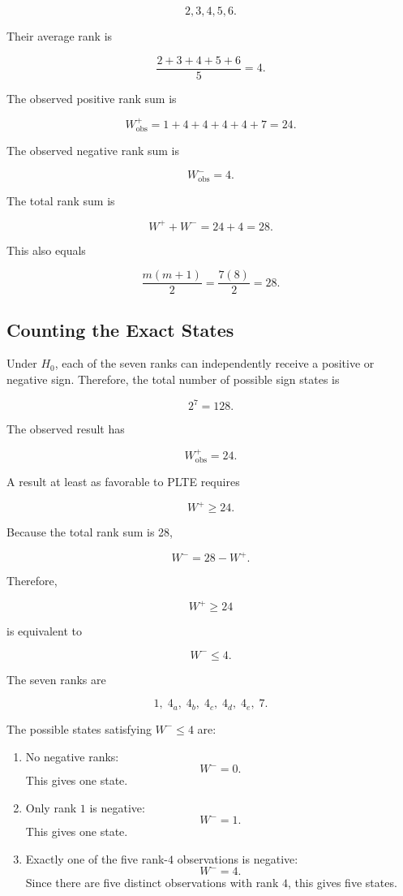 \documentclass[11pt]{article}
\begin{document}
\[
2,3,4,5,6.
\]

Their average rank is

\[
\frac{2+3+4+5+6}{5}=4.
\]

The observed positive rank sum is

\[
W^+_{\mathrm{obs}}
=
1+4+4+4+4+7
=
24.
\]

The observed negative rank sum is

\[
W^-_{\mathrm{obs}}=4.
\]

The total rank sum is

\[
W^++W^-=24+4=28.
\]

This also equals

\[
\frac{m(m+1)}{2}
=
\frac{7(8)}{2}
=
28.
\]

\subsection{Counting the Exact States}

Under \(H_0\), each of the seven ranks can independently receive a
positive or negative sign. Therefore, the total number of possible sign
states is

\[
2^7=128.
\]

The observed result has

\[
W^+_{\mathrm{obs}}=24.
\]

A result at least as favorable to PLTE requires

\[
W^+\geq24.
\]

Because the total rank sum is 28,

\[
W^-=28-W^+.
\]

Therefore,

\[
W^+\geq24
\]

is equivalent to

\[
W^-\leq4.
\]

The seven ranks are

\[
1,\;4_a,\;4_b,\;4_c,\;4_d,\;4_e,\;7.
\]

The possible states satisfying \(W^-\leq4\) are:

\begin{enumerate}[noitemsep]
    \item No negative ranks:
    \[
    W^-=0.
    \]
    This gives one state.

    \item Only rank \(1\) is negative:
    \[
    W^-=1.
    \]
    This gives one state.

    \item Exactly one of the five rank-\(4\) observations is negative:
    \[
    W^-=4.
    \]
    Since there are five distinct observations with rank \(4\), this
    gives five states.
\end{enumerate}
\end{document}
